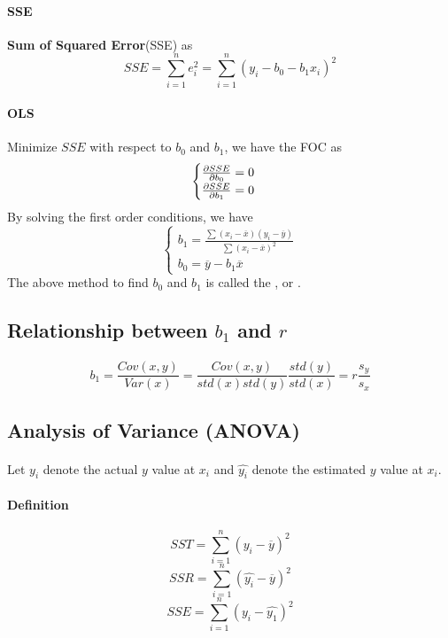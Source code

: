 \documentclass{article}
\begin{document}
		\paragraph{SSE} \textbf{Sum of Squared Error}(SSE) as
			\[
				SSE = \sum_{i=1}^n{e_i^2} = \sum_{i=1}^n(y_i - b_0 - b_1x_i)^2
			\]
		\paragraph{OLS} Minimize $SSE$ with respect to $b_0$ and $b_1$, we have the FOC as
			\[
				\begin{cases}
					\frac{\partial{SSE}}{\partial{b_0}} = 0 \\
					\frac{\partial{SSE}}{\partial{b_1}} = 0
				\end{cases}
			\]
			By solving the first order conditions, we have
			\[
				\begin{cases}
					b_1 = \frac{\sum(x_i - \overline{x})(y_i - \overline{y})}{\sum{(x_i - \overline{x})^2}} \\
					b_0 = \overline{y} - b_1 \overline{x}
				\end{cases}
			\]
			The above method to find $b_0$ and $b_1$ is called the , or .
			
		\subsection{Relationship between $b_1$ and $r$}
		\paragraph{}
			\[
				b_1 = \frac{Cov(x,y)}{Var(x)} = \frac{Cov(x,y)}{std(x)std(y)} \frac{std(y)}{std(x)} = r \frac{s_y}{s_x}
			\]
		
		\subsection{Analysis of Variance (ANOVA)}
		\paragraph{} Let $y_i$ denote the actual $y$ value at $x_i$ and $\hat{y_i}$ denote the estimated $y$ value at $x_i$.
		\paragraph{Definition}
			\[
				SST = \sum_{i=1}^n(y_i - \overline{y})^2
			\]
			\[
				SSR = \sum_{i=1}^n(\hat{y_i} - \overline{y})^2
			\]
			\[
				SSE = \sum_{i=1}^n(y_i - \hat{y_1})^2
			\]
\end{document}
